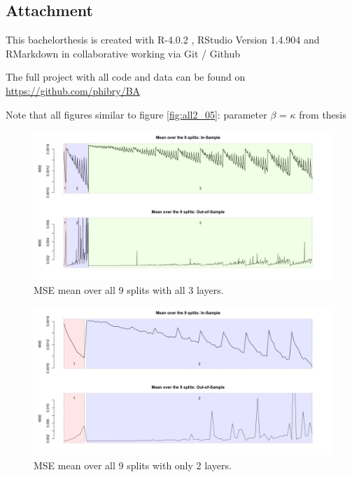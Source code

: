 \documentclass[
]{article}
\begin{document}
\newpage

\hypertarget{attachement}{%
\subsection{Attachment}\label{attachement}}

This bachelorthesis is created with R-4.0.2 , RStudio Version 1.4.904
and RMarkdown in collaborative working via Git / Github

The full project with all code and data can be found on
\url{https://github.com/phibry/BA}

Note that all figures similar to figure \ref{fig:all2_05}: parameter
\(\beta\) = \(\kappa\) from thesis

\begin{figure}

{\centering \includegraphics[width=0.9\linewidth]{images/batch5/mean_mean_3layer} 

}

\caption{MSE mean over all 9 splits with all 3 layers.}\label{fig:meanmean1}
\end{figure}

\begin{figure}

{\centering \includegraphics[width=0.9\linewidth]{images/batch5/mean_mean_2layer} 

}

\caption{MSE mean over all 9 splits with only 2 layers.}\label{fig:meanmean2}
\end{figure}
\end{document}
